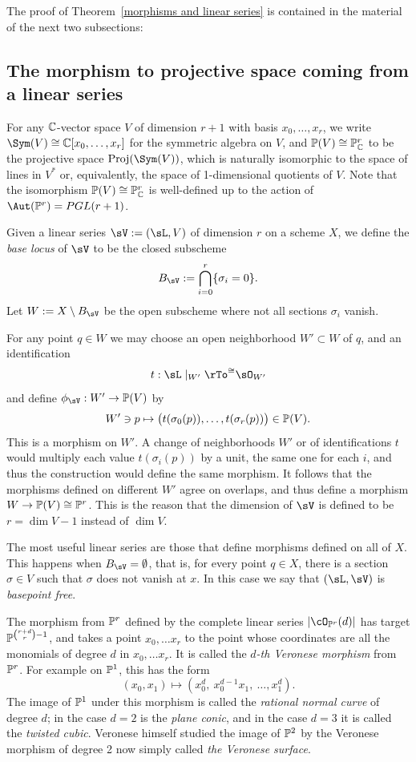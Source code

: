 The proof of Theorem~\ref{morphisms and linear series} is contained in the material of the next two subsections:

\subsection{The morphism to projective space coming from a linear series} 
For any $\CC$-vector space $V$ of dimension $r+1$ with basis $x_{0}, \dots, x_{r}$, we write $\Sym(V) \cong \CC[x_{0},\dots, x_{r}]$ for the symmetric algebra on $V$, and
$\PP(V)\cong \PP^{r}_{\CC}$ to be the projective space ${\rm Proj}(\Sym(V))$, which is naturally isomorphic to the
space of lines in $V^{*}$ or, equivalently,  the space of 1-dimensional quotients of $V$. Note that the isomorphism $\PP(V)\cong \PP^{r}_{\CC}$ is well-defined up to the action
of $\Aut(\PP^r) = PGL(r+1)$.


Given a linear series $\sV:=(\sL, V)$  of dimension $r$ on a scheme $X$, 
we define the \emph{base locus} of $\sV$ to be the closed subscheme 
$$
B_\sV := \bigcap_{i= 0}^{r}\{\sigma_{i} = 0\}.
$$
Let $W:=X\setminus B_\sV$ be the open subscheme where not all sections $\sigma_{i}$ vanish.

For any point $q\in W$ we  may choose an open neighborhood $W'\subset W$ of $q$, and an identification 
$$
t: \sL\mid_{W'} \rTo^{\cong} \sO_{W'}
$$
and define $\phi_{\sV}: W' \to \PP(V)$ by 
$$
W'\ni p \mapsto \bigl(t(\sigma_{0}(p)),\dots, t(\sigma_{r}(p))\bigr) \in \PP(V).
$$
This  is a morphism on $W'$. A change of neighborhoods $W'$ or of identifications $t$ would multiply
each value $t(\sigma_{i}(p))$ by a unit, the same one for each $i$, and thus the construction would define the same morphism. It follows that the morphisms
defined on different $W'$ agree on overlaps, and thus define a morphism $W \to \PP(V) \cong \PP^r$. This is the reason
that the dimension of $\sV$ is defined to be $r=\dim V -1$ instead of $\dim V$.

The most useful linear series are those that define morphisms defined on all of $X$. This happens when $B_\sV = \emptyset$,
that is, for every point $q\in X$, there is a section $\sigma \in V$ such that $\sigma$ does not vanish at $x$. In this case we say that $(\sL, \sV)$ is \emph{basepoint free}.

\begin{example}\label{Veronese definition}
The morphism from $\PP^r$ defined by the complete linear series $|\cO_{\PP^r}(d)|$ has target
$\PP^{{r+d\choose r}-1}$, and takes a point $x_0,\dots x_r$ to the point whose coordinates are all the monomials of
degree $d$ in $x_0,\dots x_r$. It is called the \emph{$d$-th Veronese morphism} from $\PP^r$. For example on $\PP^1$, this has the form
$$
(x_0,x_1) \mapsto (x_0^d,\ x_0^{d-1}x_1,\ \dots,x_1^d).
$$
The image of $\PP^1$ under this morphism is called the \emph{rational normal curve} of degree $d$; in the case $d=2$ is the
\emph{plane conic}, and in the case $d=3$ it is called the \emph{twisted cubic}. Veronese himself studied the image of $\PP^2$
by the Veronese morphism of degree 2 now simply called \emph{the Veronese surface}.
\end{example}

